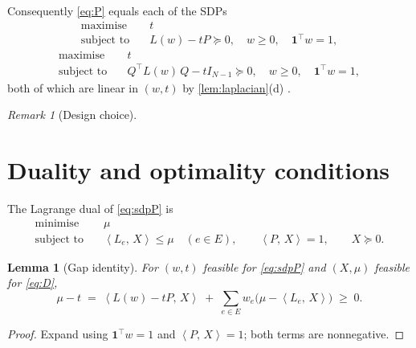 \documentclass[11pt,a4paper]{article}
\newif\ifdraftnotes
\newcommand{\todo}[1]{\ifdraftnotes{\color{red!70!black}\sffamily[TODO: #1]}\fi}
\theoremstyle{plain}
\newtheorem{lemma}[theorem]{Lemma}
\theoremstyle{definition}
\theoremstyle{remark}
\newtheorem{remark}[theorem]{Remark}
\newcommand{\one}{\mathbf{1}}
\newcommand{\ip}[2]{\left\langle #1,\, #2 \right\rangle}
\newcommand{\code}[1]{\texttt{#1}}
\begin{document}
	Consequently \eqref{eq:P} equals each of the SDPs
	\begin{equation}\label{eq:sdpP}\tag{SDP$_P$}
		\begin{aligned}
			\text{maximise}\quad & t\\
			\text{subject to}\quad & L(w)-tP\succeq0,\quad w\ge0,\quad \one^\top w=1,
		\end{aligned}
	\end{equation}
	\begin{equation}\label{eq:sdpQ}\tag{SDP$_Q$}
		\begin{aligned}
			\text{maximise}\quad & t\\
			\text{subject to}\quad & Q^\top L(w)\,Q-tI_{N-1}\succeq0,\quad
			w\ge0,\quad \one^\top w=1,
		\end{aligned}
	\end{equation}
	both of which are linear in $(w,t)$ by \cref{lem:laplacian}(d)
	\cite{VandenbergheBoyd1996,Boyd2006}.
	
	\begin{remark}[Design choice]
		\todo{Which formulation the code uses and why (matrix size $N$ vs.\ $N-1$,
			sparsity of $L(w)$ vs.\ density of $Q$, conditioning, ease of extracting
			the dual). How $Q$ is built, e.g.\ \code{scipy.linalg.null\_space}.}
	\end{remark}
	
	\section{Duality and optimality conditions}\label{sec:duality}
	
	The Lagrange dual of \eqref{eq:sdpP} is
	\begin{equation}\label{eq:D}\tag{D}
		\begin{aligned}
			\text{minimise}\quad & \mu\\
			\text{subject to}\quad & \ip{L_e}{X}\le\mu\quad(e\in E),\qquad
			\ip{P}{X}=1,\qquad X\succeq0 .
		\end{aligned}
	\end{equation}
	\todo{Derive via the Lagrangian $t+\ip{X}{L(w)-tP}+\mu(1-\one^\top w)$.}
	
	\begin{lemma}[Gap identity]\label{lem:gap}
		For $(w,t)$ feasible for \eqref{eq:sdpP} and $(X,\mu)$ feasible for
		\eqref{eq:D},
		\[
		\mu-t \;=\; \ip{L(w)-tP}{X} \;+\; \sum_{e\in E} w_e
		\bigl(\mu-\ip{L_e}{X}\bigr) \;\ge\; 0 .
		\]
	\end{lemma}
	\begin{proof}
		Expand using $\one^\top w=1$ and $\ip{P}{X}=1$; both terms are
		nonnegative. \todo{write out}
	\end{proof}
	
\end{document}

